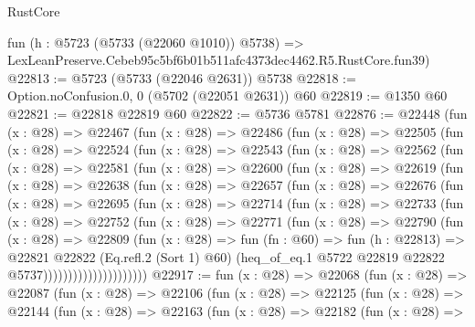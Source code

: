 \begin{lexlean}{RustCore}
\begin{coremodule}
    fun (h : @5723 (@5733 (@22060 @1010)) @5738) =>
    LexLeanPreserve.Cebeb95c5bf6b01b511afc4373dec4462.R5.RustCore.fun39)
@22813 := @5723 (@5733 (@22046 @2631)) @5738
@22818 := Option.noConfusion.{0, 0} (@5702 (@22051 @2631)) @60
@22819 := @1350 @60
@22821 := @22818 @22819 @60
@22822 := @5736 @5781
@22876 := @22448
    (fun (x : @28) =>
    @22467
      (fun (x : @28) =>
      @22486
        (fun (x : @28) =>
        @22505
          (fun (x : @28) =>
          @22524
            (fun (x : @28) =>
            @22543
              (fun (x : @28) =>
              @22562
                (fun (x : @28) =>
                @22581
                  (fun (x : @28) =>
                  @22600
                    (fun (x : @28) =>
                    @22619
                      (fun (x : @28) =>
                      @22638
                        (fun (x : @28) =>
                        @22657
                          (fun (x : @28) =>
                          @22676
                            (fun (x : @28) =>
                            @22695
                              (fun (x : @28) =>
                              @22714
                                (fun (x : @28) =>
                                @22733
                                  (fun (x : @28) =>
                                  @22752
                                    (fun (x : @28) =>
                                    @22771
                                      (fun (x : @28) =>
                                      @22790
                                        (fun (x : @28) =>
                                        @22809
                                          (fun (x : @28) =>
                                          fun (fn : @60) =>
                                          fun (h : @22813) =>
                                          @22821
                                            @22822
                                            (Eq.refl.{2} (Sort 1) @60)
                                            (heq_of_eq.{1}
                                              @5722
                                              @22819
                                              @22822
                                              @5737)))))))))))))))))))))
@22917 := fun (x : @28) =>
  @22068
    (fun (x : @28) =>
    @22087
      (fun (x : @28) =>
      @22106
        (fun (x : @28) =>
        @22125
          (fun (x : @28) =>
          @22144
            (fun (x : @28) =>
            @22163
              (fun (x : @28) =>
              @22182
                (fun (x : @28) =>

\end{coremodule}
\end{lexlean}
